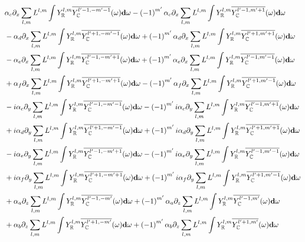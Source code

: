 \documentclass[10pt]{scrartcl}
\begin{document}
\begin{align*}
&
\alpha_c\partial_x\sum_{l,m}L^{l,m}\int{Y_{\mathbb{R}}^{l,m}\overline{Y_{\mathbb{C}}^{l'-1, -m'-1}}(\omega )\mathbf{d}\omega}
-\left({-1}\right)^{m'}\alpha_c\partial_x\sum_{l,m}L^{l,m}\int{Y_{\mathbb{R}}^{l,m}\overline{Y_{\mathbb{C}}^{l'-1, m'+1}}(\omega )\mathbf{d}\omega}
\\&
-\alpha_d\partial_x\sum_{l,m}L^{l,m}\int{Y_{\mathbb{R}}^{l,m}\overline{Y_{\mathbb{C}}^{l'+1, -m'-1}}(\omega )\mathbf{d}\omega}
+\left({-1}\right)^{m'}\alpha_d\partial_x\sum_{l,m}L^{l,m}\int{Y_{\mathbb{R}}^{l,m}\overline{Y_{\mathbb{C}}^{l'+1, m'+1}}(\omega )\mathbf{d}\omega}
\\&
-\alpha_e\partial_x\sum_{l,m}L^{l,m}\int{Y_{\mathbb{R}}^{l,m}\overline{Y_{\mathbb{C}}^{l'-1, -m'+1}}(\omega )\mathbf{d}\omega}
+\left({-1}\right)^{m'}\alpha_e\partial_x\sum_{l,m}L^{l,m}\int{Y_{\mathbb{R}}^{l,m}\overline{Y_{\mathbb{C}}^{l'-1, m'-1}}(\omega )\mathbf{d}\omega}
\\&
+\alpha_f\partial_x\sum_{l,m}L^{l,m}\int{Y_{\mathbb{R}}^{l,m}\overline{Y_{\mathbb{C}}^{l'+1, -m'+1}}(\omega )\mathbf{d}\omega}
-\left({-1}\right)^{m'}\alpha_f\partial_x\sum_{l,m}L^{l,m}\int{Y_{\mathbb{R}}^{l,m}\overline{Y_{\mathbb{C}}^{l'+1, m'-1}}(\omega )\mathbf{d}\omega}
\\&
-i \alpha_c\partial_y\sum_{l,m}L^{l,m}\int{Y_{\mathbb{R}}^{l,m}\overline{Y_{\mathbb{C}}^{l'-1, -m'-1}}(\omega )\mathbf{d}\omega}
-\left({-1}\right)^{m'}i \alpha_c\partial_y\sum_{l,m}L^{l,m}\int{Y_{\mathbb{R}}^{l,m}\overline{Y_{\mathbb{C}}^{l'-1, m'+1}}(\omega )\mathbf{d}\omega}
\\&
+i \alpha_d\partial_y\sum_{l,m}L^{l,m}\int{Y_{\mathbb{R}}^{l,m}\overline{Y_{\mathbb{C}}^{l'+1, -m'-1}}(\omega )\mathbf{d}\omega}
+\left({-1}\right)^{m'}i \alpha_d\partial_y\sum_{l,m}L^{l,m}\int{Y_{\mathbb{R}}^{l,m}\overline{Y_{\mathbb{C}}^{l'+1, m'+1}}(\omega )\mathbf{d}\omega}
\\&
-i \alpha_e\partial_y\sum_{l,m}L^{l,m}\int{Y_{\mathbb{R}}^{l,m}\overline{Y_{\mathbb{C}}^{l'-1, -m'+1}}(\omega )\mathbf{d}\omega}
-\left({-1}\right)^{m'}i \alpha_e\partial_y\sum_{l,m}L^{l,m}\int{Y_{\mathbb{R}}^{l,m}\overline{Y_{\mathbb{C}}^{l'-1, m'-1}}(\omega )\mathbf{d}\omega}
\\&
+i \alpha_f\partial_y\sum_{l,m}L^{l,m}\int{Y_{\mathbb{R}}^{l,m}\overline{Y_{\mathbb{C}}^{l'+1, -m'+1}}(\omega )\mathbf{d}\omega}
+\left({-1}\right)^{m'}i \alpha_f\partial_y\sum_{l,m}L^{l,m}\int{Y_{\mathbb{R}}^{l,m}\overline{Y_{\mathbb{C}}^{l'+1, m'-1}}(\omega )\mathbf{d}\omega}
\\&
+\alpha_a\partial_z\sum_{l,m}L^{l,m}\int{Y_{\mathbb{R}}^{l,m}\overline{Y_{\mathbb{C}}^{l'-1, -m'}}(\omega )\mathbf{d}\omega}
+\left({-1}\right)^{m'}\alpha_a\partial_z\sum_{l,m}L^{l,m}\int{Y_{\mathbb{R}}^{l,m}\overline{Y_{\mathbb{C}}^{l'-1, m'}}(\omega )\mathbf{d}\omega}
\\&
+\alpha_b\partial_z\sum_{l,m}L^{l,m}\int{Y_{\mathbb{R}}^{l,m}\overline{Y_{\mathbb{C}}^{l'+1, -m'}}(\omega )\mathbf{d}\omega}
+\left({-1}\right)^{m'}\alpha_b\partial_z\sum_{l,m}L^{l,m}\int{Y_{\mathbb{R}}^{l,m}\overline{Y_{\mathbb{C}}^{l'+1, m'}}(\omega )\mathbf{d}\omega}
\end{align*}
\end{document}
